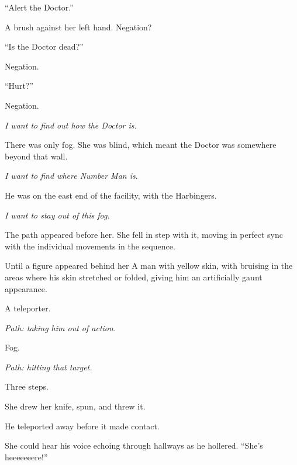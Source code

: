 ``Alert the Doctor.''



A brush against her left hand.  Negation?



``Is the Doctor dead?''



Negation.



``Hurt?''



Negation.



\emph{I want to find out how the Doctor is.}



There was only fog.  She was blind, which meant the Doctor was somewhere beyond that wall.



\emph{I want to find where Number Man is}.



He was on the east end of the facility, with the Harbingers.



\emph{I want to stay out of this fog.}



The path appeared before her.  She fell in step with it, moving in perfect sync with the individual movements in the sequence.



Until a figure appeared behind her  A man with yellow skin, with bruising in the areas where his skin stretched or folded, giving him an artificially gaunt appearance.



A teleporter.



\emph{Path: taking him out of action.}



Fog.



\emph{Path:  hitting that target.}



Three steps.



She drew her knife, spun, and threw it.



He teleported away before it made contact.



She could hear his voice echoing through hallways as he hollered.  ``She's heeeeeeere!''



